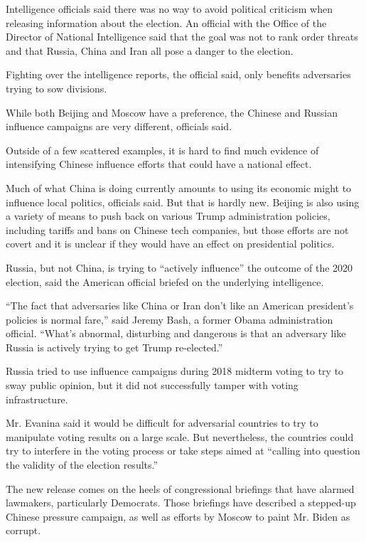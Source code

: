 Intelligence officials said there was no way to avoid political
criticism when releasing information about the election. An official
with the Office of the Director of National Intelligence said that the
goal was not to rank order threats and that Russia, China and Iran all
pose a danger to the election.

Fighting over the intelligence reports, the official said, only benefits
adversaries trying to sow divisions.

While both Beijing and Moscow have a preference, the Chinese and Russian
influence campaigns are very different, officials said.

Outside of a few scattered examples, it is hard to find much evidence of
intensifying Chinese influence efforts that could have a national
effect.

Much of what China is doing currently amounts to using its economic
might to influence local politics, officials said. But that is hardly
new. Beijing is also using a variety of means to push back on various
Trump administration policies, including tariffs and bans on Chinese
tech companies, but those efforts are not covert and it is unclear if
they would have an effect on presidential politics.

Russia, but not China, is trying to ``actively influence'' the outcome
of the 2020 election, said the American official briefed on the
underlying intelligence.

``The fact that adversaries like China or Iran don't like an American
president's policies is normal fare,'' said Jeremy Bash, a former Obama
administration official. ``What's abnormal, disturbing and dangerous is
that an adversary like Russia is actively trying to get Trump
re-elected.''

Russia tried to use influence campaigns during 2018 midterm voting to
try to sway public opinion, but it did not successfully tamper with
voting infrastructure.

Mr. Evanina said it would be difficult for adversarial countries to try
to manipulate voting results on a large scale. But nevertheless, the
countries could try to interfere in the voting process or take steps
aimed at ``calling into question the validity of the election results.''

The new release comes on the heels of congressional briefings that have
alarmed lawmakers, particularly Democrats. Those briefings have
described a stepped-up Chinese pressure campaign, as well as efforts by
Moscow to paint Mr. Biden as corrupt.

